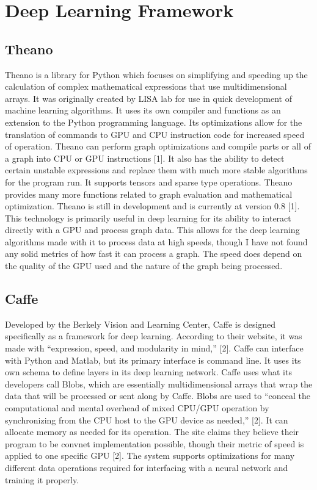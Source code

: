 \documentclass{scrreprt}
\begin{document}
\section{Deep Learning Framework}

\subsection{Theano}
Theano is a library for Python which focuses on simplifying and speeding up the calculation of
complex mathematical expressions that use multidimensional arrays. It was originally created by
LISA lab for use in quick development of machine learning algorithms. It uses its own compiler
and functions as an extension to the Python programming language. Its optimizations allow for
the translation of commands to GPU and CPU instruction code for increased speed of operation.
Theano can perform graph optimizations and compile parts or all of a graph into CPU or GPU
instructions [1]. It also has the ability to detect certain unstable expressions and replace them
with much more stable algorithms for the program run. It supports tensors and sparse type
operations. Theano provides many more functions related to graph evaluation and mathematical
optimization. Theano is still in development and is currently at version 0.8 [1]. This technology
is primarily useful in deep learning for its ability to interact directly with a GPU and process
graph data. This allows for the deep learning algorithms made with it to process data at high
speeds, though I have not found any solid metrics of how fast it can process a graph. The speed
does depend on the quality of the GPU used and the nature of the graph being processed.

\subsection{Caffe}
Developed by the Berkely Vision and Learning Center, Caffe is designed specifically as a
framework for deep learning. According to their website, it was made with “expression, speed,
and modularity in mind,” [2]. Caffe can interface with Python and Matlab, but its primary
interface is command line. It uses its own schema to define layers in its deep learning network.
Caffe uses what its developers call Blobs, which are essentially multidimensional arrays that
wrap the data that will be processed or sent along by Caffe. Blobs are used to “conceal the
computational and mental overhead of mixed CPU/GPU operation by synchronizing from the
CPU host to the GPU device as needed,” [2]. It can allocate memory as needed for its operation.
The site claims they believe their program to be convnet implementation possible, though their
metric of speed is applied to one specific GPU [2]. The system supports optimizations for many
different data operations required for interfacing with a neural network and training it properly.
\end{document}

